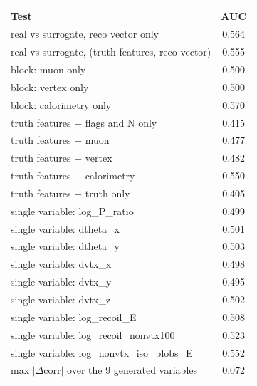\begin{tabular}{lc}
\toprule
Test & AUC \\
\midrule
real vs surrogate, reco vector only & 0.564 \\
real vs surrogate, (truth features, reco vector) & 0.555 \\
\midrule
block: muon only & 0.500 \\
block: vertex only & 0.500 \\
block: calorimetry only & 0.570 \\
truth features + flags and N only & 0.415 \\
truth features + muon & 0.477 \\
truth features + vertex & 0.482 \\
truth features + calorimetry & 0.550 \\
truth features + truth only & 0.405 \\
single variable: log\_P\_ratio & 0.499 \\
single variable: dtheta\_x & 0.501 \\
single variable: dtheta\_y & 0.503 \\
single variable: dvtx\_x & 0.498 \\
single variable: dvtx\_y & 0.495 \\
single variable: dvtx\_z & 0.502 \\
single variable: log\_recoil\_E & 0.508 \\
single variable: log\_recoil\_nonvtx100 & 0.523 \\
single variable: log\_nonvtx\_iso\_blobs\_E & 0.552 \\
\midrule
max $|\Delta$corr$|$ over the 9 generated variables & 0.072 \\
\bottomrule
\end{tabular}
